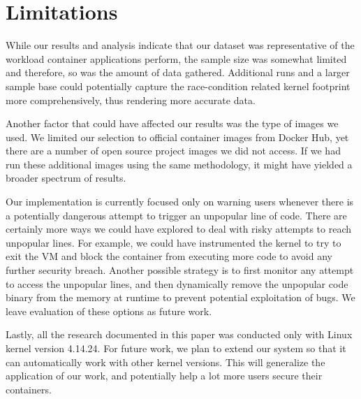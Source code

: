 \section{Limitations}
\label{sec.limitation}
While our results and analysis indicate that our dataset was representative of the workload container applications perform, the sample size was somewhat limited and therefore, 
so was the amount of data gathered. Additional runs and a larger sample base could potentially capture the race-condition related kernel footprint more comprehensively, 
thus rendering more accurate data. 

Another factor that could have affected our results was the type of images we used. We limited our selection to official container images from Docker Hub, 
yet there are a number of open source project images we did not access. If we had run these additional images using the same methodology, 
it might have yielded a broader spectrum of results.

Our implementation is currently focused only on warning users whenever there is a potentially dangerous attempt to trigger an unpopular line of code. 
There are certainly more ways we could have explored to deal with risky attempts to reach unpopular lines. 
For example, we could have instrumented the kernel to try to exit the VM and block the container from executing more code to avoid any further security breach. 
Another possible strategy is to first monitor any attempt to access the unpopular lines, and then dynamically remove the unpopular code binary from the memory at runtime 
to prevent potential exploitation of bugs. We leave evaluation of these options as future work.

Lastly, all the research documented in this paper was conducted only with Linux kernel version 4.14.24. 
For future work, we plan to extend our system so that it can automatically work with other kernel versions. 
This will generalize the application of our work, and potentially help a lot more users secure their containers. 
